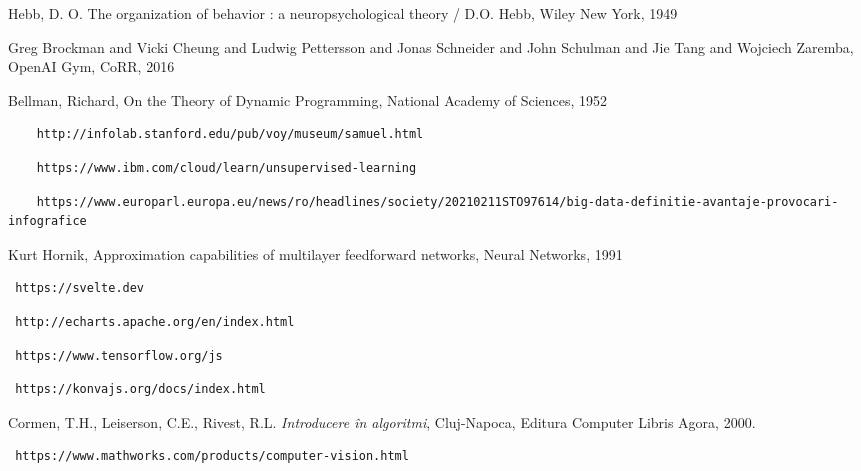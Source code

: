 


\begin{thebibliography}{99}

 Hebb, D. O.  The organization of behavior : a neuropsychological theory / D.O. Hebb, Wiley New York, 1949

 Greg Brockman and Vicki Cheung and Ludwig Pettersson and Jonas Schneider and John Schulman and Jie Tang and Wojciech Zaremba, OpenAI Gym, CoRR, 2016

 Bellman, Richard, On the Theory of Dynamic Programming, National Academy of Sciences, 1952

 \begin{verbatim}
	http://infolab.stanford.edu/pub/voy/museum/samuel.html
\end{verbatim}

 \begin{verbatim}
	https://www.ibm.com/cloud/learn/unsupervised-learning
\end{verbatim}

 \begin{verbatim}
	https://www.europarl.europa.eu/news/ro/headlines/society/20210211STO97614/big-data-definitie-avantaje-provocari-infografice
\end{verbatim}

 Kurt Hornik, Approximation capabilities of multilayer feedforward networks, Neural Networks, 1991

 \begin{verbatim} https://svelte.dev 
\end{verbatim}

 \begin{verbatim} http://echarts.apache.org/en/index.html 
\end{verbatim}

 \begin{verbatim} https://www.tensorflow.org/js 
\end{verbatim}

 \begin{verbatim} https://konvajs.org/docs/index.html
\end{verbatim}




 Cormen,  T.H.,  Leiserson,  C.E.,  Rivest,  R.L. \textit{Introducere \^ in algoritmi}, Cluj-Napoca, Editura Computer Libris Agora, 2000.

 \begin{verbatim} https://www.mathworks.com/products/computer-vision.html
\end{verbatim}


\end{thebibliography}

